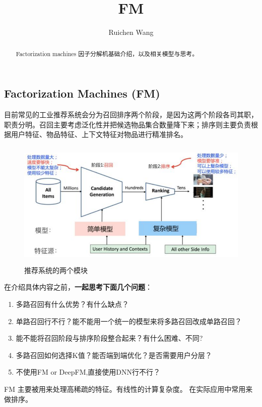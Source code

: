 \documentclass{article}
\author{Ruichen Wang}
\title{FM}
\begin{document}
\begin{CJK*}{UTF8}{gbsn}

\maketitle
\begin{abstract}
Factorization machines 因子分解机基础介绍，以及相关模型与思考。
\end{abstract}

\tableofcontents

\section{Factorization Machines (FM)}
目前常见的工业推荐系统会分为召回排序两个阶段，是因为这两个阶段各司其职，职责分明。召回主要考虑泛化性并把候选物品集合数量降下来；排序则主要负责根据用户特征、物品特征、上下文特征对物品进行精准排名。

\begin{figure}[H]
\centering
\includegraphics[width=4.8in,height=2.4in]{recsys}
\caption{推荐系统的两个模块}
\end{figure}

在介绍具体内容之前，\textbf{一起思考下面几个问题}：
\begin{enumerate}
\item{多路召回有什么优势？有什么缺点？}
\item{单路召回行不行？能不能用一个统一的模型来将多路召回改成单路召回？}
\item{能不能将召回阶段与排序阶段整合起来？有什么困难、不同?}
\item{多路召回如何选择K值？能否端到端优化？是否需要用户分层？}
\item{不使用FM or DeepFM,直接使用DNN行不行？}
\end{enumerate}


FM \cite{DBLP:conf/icdm/Rendle10} 主要被用来处理高稀疏的特征。有线性的计算复杂度。 在实际应用中常用来做排序。


\end{CJK*}
\end{document}
